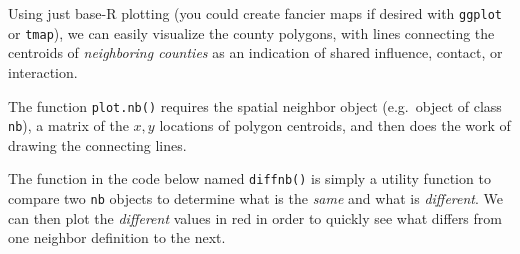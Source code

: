 \documentclass[
]{book}
\begin{document}
Using just base-R plotting (you could create fancier maps if desired with \texttt{ggplot} or \texttt{tmap}), we can easily visualize the county polygons, with lines connecting the centroids of \emph{neighboring counties} as an indication of shared influence, contact, or interaction.

The function \texttt{plot.nb()} requires the spatial neighbor object (e.g.~object of class \texttt{nb}), a matrix of the \(x, y\) locations of polygon centroids, and then does the work of drawing the connecting lines.

The function in the code below named \texttt{diffnb()} is simply a utility function to compare two \texttt{nb} objects to determine what is the \emph{same} and what is \emph{different}. We can then plot the \emph{different} values in red in order to quickly see what differs from one neighbor definition to the next.
\end{document}
